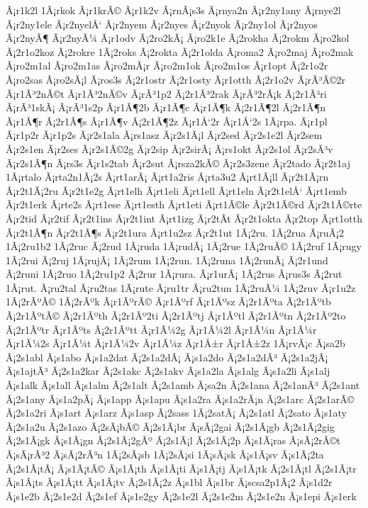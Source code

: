 {Ã¡r1k2l
1Ã¡rkok
Ã¡r1krÃ©
Ã¡r1k2v
Ã¡rnÃ¡s3s
Ã¡rnya2n
Ã¡r2ny1any
Ã¡rnye2l
Ã¡r2ny1ele
Ã¡r2nyelÅ‘
Ã¡r2nyem
Ã¡r2nyes
Ã¡r2nyok
Ã¡r2ny1ol
Ã¡r2nyos
Ã¡r2nyÃ¶
Ã¡r2nyÃ¼
Ã¡r1odv
Ã¡2ro2kÃ¡
Ã¡ro2k1e
Ã¡2rokha
Ã¡2rokm
Ã¡ro2kol
Ã¡2r1o2koz
Ã¡2rokre
1Ã¡2roks
Ã¡2rokta
Ã¡2r1olda
Ã¡roma2
Ã¡ro2maj
Ã¡ro2mak
Ã¡ro2m1al
Ã¡ro2m1as
Ã¡ro2mÃ¡r
Ã¡ro2m1ok
Ã¡ro2m1os
Ã¡r1opt
Ã¡2r1o2r
Ã¡ro2sas
Ã¡ro2sÃ¡l
Ã¡ros3s
Ã¡2r1ostr
Ã¡2r1osty
Ã¡r1otth
Ã¡2r1o2v
Ã¡rÃ³Ã©2r
Ã¡r1Ã³2nÃ©t
Ã¡r1Ã³2nÃ©v
Ã¡rÃ³1p2
Ã¡2r1Ã³2rak
Ã¡rÃ³2rÃ¡k
Ã¡2r1Ã³ri
Ã¡rÃ³1skÃ¡
Ã¡rÃ³1s2p
Ã¡r1Ã¶2b
Ã¡r1Ã¶c
Ã¡r1Ã¶k
Ã¡2r1Ã¶2l
Ã¡2r1Ã¶n
Ã¡r1Ã¶r
Ã¡2r1Ã¶s
Ã¡r1Ã¶v
Ã¡2r1Ã¶2z
Ã¡r1Å‘2r
Ã¡r1Å‘2s
1Ã¡rpa.
Ã¡r1pl
Ã¡r1p2r
Ã¡r1p2s
Ã¡r2s1ala
Ã¡rs1asz
Ã¡r2s1Ã¡l
Ã¡r2sed
Ã¡r2s1e2l
Ã¡r2sem
Ã¡r2s1en
Ã¡r2ses
Ã¡r2s1Ã©2g
Ã¡r2sip
Ã¡r2sirÃ¡
Ã¡rs1okt
Ã¡r2s1ol
Ã¡r2sÃ³v
Ã¡r2s1Ã¶n
Ã¡rs3s
Ã¡r1s2tab
Ã¡r2sut
Ã¡rsza2kÃ©
Ã¡r2s3zene
Ã¡r2tado
Ã¡r2t1aj
1Ã¡rtalo
Ã¡rta2n1Ã¡2s
Ã¡rt1arÃ¡
Ã¡rt1a2ris
Ã¡rta3u2
Ã¡rt1Ã¡ll
Ã¡r2t1Ã¡rn
Ã¡r2t1Ã¡2ru
Ã¡r2t1e2g
Ã¡rt1elh
Ã¡rt1eli
Ã¡rt1ell
Ã¡rt1eln
Ã¡r2t1elÅ‘
Ã¡rt1emb
Ã¡r2t1erk
Ã¡rte2s
Ã¡rt1ese
Ã¡rt1esth
Ã¡rt1eti
Ã¡rt1Ã©le
Ã¡r2t1Ã©rd
Ã¡r2t1Ã©rte
Ã¡r2tid
Ã¡r2tif
Ã¡r2t1ins
Ã¡r2t1int
Ã¡rt1izg
Ã¡r2tÃ­t
Ã¡r2t1okta
Ã¡r2top
Ã¡rt1otth
Ã¡r2t1Ã¶n
Ã¡r2t1Ã¶s
Ã¡r2t1ura
Ã¡rt1u2sz
Ã¡r2t1ut
1Ã¡2ru.
1Ã¡2rua
Ã¡ruÃ¡2
1Ã¡2ru1b2
1Ã¡2ruc
Ã¡2rud
1Ã¡ruda
1Ã¡rudÃ¡
1Ã¡2rue
1Ã¡2ruÃ©
1Ã¡2ruf
1Ã¡rugy
1Ã¡2rui
Ã¡2ruj
1Ã¡rujÃ¡
1Ã¡2rum
1Ã¡2run.
1Ã¡2runa
1Ã¡2runÃ¡
Ã¡2r1und
Ã¡2runi
1Ã¡2ruo
1Ã¡2ru1p2
Ã¡2rur
1Ã¡rura.
Ã¡r1urÃ¡
1Ã¡2rus
Ã¡rus3s
Ã¡2rut
1Ã¡rut.
Ã¡ru2tal
Ã¡ru2tas
1Ã¡rute
Ã¡ru1tr
Ã¡ru2tun
1Ã¡2ruÃ¼
1Ã¡2ruv
Ã¡r1u2z
1Ã¡2rÃºÃ©
1Ã¡2rÃºk
Ã¡r1ÃºrÃ©
Ã¡r1Ãºrf
Ã¡r1Ãºsz
Ã¡2r1Ãºta
Ã¡2r1Ãºtb
Ã¡2r1ÃºtÃ©
Ã¡2r1Ãºth
Ã¡2r1Ãº2ti
Ã¡2r1Ãºtj
Ã¡r1Ãºtl
Ã¡2r1Ãºtn
Ã¡2r1Ãº2to
Ã¡2r1Ãºtr
Ã¡r1Ãºts
Ã¡2r1Ãºtt
Ã¡r1Ã¼2g
Ã¡r1Ã¼2l
Ã¡r1Ã¼n
Ã¡r1Ã¼r
Ã¡r1Ã¼2s
Ã¡r1Ã¼t
Ã¡r1Ã¼2v
Ã¡r1Ã¼z
Ã¡r1Å±r
Ã¡r1Å±2z
1Ã¡rvÃ¡c
Ã¡sa2b
Ã¡2s1abl
Ã¡s1abo
Ã¡s1a2dat
Ã¡2s1a2dÃ¡
Ã¡s1a2do
Ã¡2s1a2dÃ³
Ã¡2s1a2jÃ¡
Ã¡s1ajtÃ³
Ã¡2s1a2kar
Ã¡2s1akc
Ã¡2s1akv
Ã¡s1a2la
Ã¡s1alg
Ã¡s1a2li
Ã¡s1alj
Ã¡s1alk
Ã¡s1all
Ã¡s1alm
Ã¡2s1alt
Ã¡2s1amb
Ã¡sa2n
Ã¡2s1ana
Ã¡2s1anÃ³
Ã¡2s1ant
Ã¡2s1any
Ã¡s1a2pÃ¡
Ã¡s1app
Ã¡s1apu
Ã¡s1a2ra
Ã¡s1a2rÃ¡n
Ã¡2s1arc
Ã¡2s1arÃ©
Ã¡2s1a2ri
Ã¡s1art
Ã¡s1arz
Ã¡s1asp
Ã¡2sass
1Ã¡2satÃ¡
Ã¡2s1atl
Ã¡2sato
Ã¡s1aty
Ã¡2s1a2u
Ã¡2s1azo
Ã¡2sÃ¡bÃ©
Ã¡2s1Ã¡br
Ã¡sÃ¡2gai
Ã¡2s1Ã¡gb
Ã¡2s1Ã¡2gig
Ã¡2s1Ã¡gk
Ã¡s1Ã¡gn
Ã¡2s1Ã¡2gÃº
Ã¡2s1Ã¡l
Ã¡2s1Ã¡2p
Ã¡s1Ã¡ras
Ã¡sÃ¡2rÃ©t
Ã¡sÃ¡rÃ³2
Ã¡sÃ¡2rÃ³n
1Ã¡2sÃ¡sb
1Ã¡2sÃ¡si
1Ã¡sÃ¡sk
Ã¡s1Ã¡sv
Ã¡s1Ã¡2ta
Ã¡2s1Ã¡tÃ¡
Ã¡s1Ã¡tÃ©
Ã¡s1Ã¡th
Ã¡s1Ã¡ti
Ã¡s1Ã¡tj
Ã¡s1Ã¡tk
Ã¡2s1Ã¡tl
Ã¡2s1Ã¡tr
Ã¡s1Ã¡ts
Ã¡s1Ã¡tt
Ã¡s1Ã¡tv
Ã¡2s1Ã¡2z
Ã¡s1bl
Ã¡s1br
Ã¡scsa2p1Ã¡2
Ã¡s1d2r
Ã¡s1e2b
Ã¡2s1e2d
Ã¡2s1ef
Ã¡s1e2gy
Ã¡2s1e2l
Ã¡2s1e2m
Ã¡2s1e2n
Ã¡s1epi
Ã¡s1erk
}
